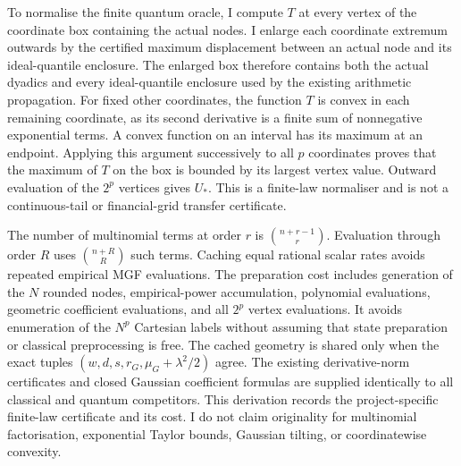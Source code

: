 To normalise the finite quantum oracle, I compute $T$ at every vertex of
the coordinate box containing the actual nodes. I enlarge each coordinate
extremum outwards by the certified maximum displacement between an actual
node and its ideal-quantile enclosure. The enlarged box therefore contains
both the actual dyadics and every ideal-quantile enclosure used by the
existing arithmetic propagation. For fixed other coordinates,
the function $T$ is convex in each remaining coordinate, as its second
derivative is a finite sum of nonnegative exponential terms. A convex
function on an interval has its maximum at an endpoint. Applying this
argument successively to all $p$ coordinates proves that the maximum of
$T$ on the box is bounded by its largest vertex value. Outward evaluation
of the $2^p$ vertices gives $U_*$. This is a finite-law normaliser and is
not a continuous-tail or financial-grid transfer certificate.

The number of multinomial terms at order $r$ is
$\binom{n+r-1}{r}$. Evaluation through order $R$ uses
$\binom{n+R}{R}$ such terms. Caching equal rational scalar rates avoids
repeated empirical MGF evaluations. The preparation cost includes generation
of the $N$ rounded nodes, empirical-power accumulation, polynomial evaluations,
geometric coefficient evaluations, and all $2^p$ vertex evaluations.
It avoids enumeration of the $N^p$ Cartesian labels without assuming that
state preparation or classical preprocessing is free. The cached geometry is
shared only when the exact tuples $(w,d,s,r_G,\mu_G+\lambda^2/2)$ agree.
The existing derivative-norm certificates and closed Gaussian coefficient
formulas are supplied identically to all classical and quantum competitors.
This derivation records the project-specific finite-law certificate and its
cost. I do not claim originality for multinomial factorisation, exponential
Taylor bounds, Gaussian tilting, or coordinatewise convexity.
